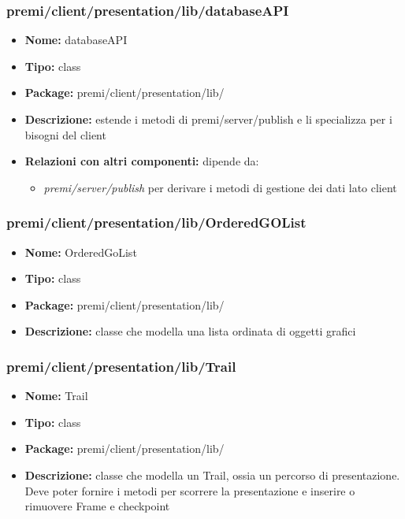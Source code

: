 \subsubsection{premi/client/presentation/lib/databaseAPI}
\begin{itemize}
  \item[] \textbf{Nome:} databaseAPI
  \item[] \textbf{Tipo:} class
  \item[] \textbf{Package:} premi/client/presentation/lib/
  \item[] \textbf{Descrizione:} estende i metodi di premi/server/publish e li specializza per i bisogni del client
   \item[] \textbf{Relazioni con altri componenti:} dipende da:
 \begin{itemize}
 \item \textit{premi/server/publish} per derivare i metodi di gestione dei dati lato client
 \end{itemize}
\end{itemize}


\subsubsection{premi/client/presentation/lib/OrderedGOList}
\begin{itemize}
  \item[] \textbf{Nome:} OrderedGoList
  \item[] \textbf{Tipo:} class
  \item[] \textbf{Package:} premi/client/presentation/lib/
  \item[] \textbf{Descrizione:} classe che modella una lista ordinata di oggetti grafici
\end{itemize}
  
\subsubsection{premi/client/presentation/lib/Trail}
\begin{itemize}
  \item[] \textbf{Nome:} Trail
  \item[] \textbf{Tipo:} class
  \item[] \textbf{Package:} premi/client/presentation/lib/
  \item[] \textbf{Descrizione:} classe che modella un Trail, ossia un percorso di presentazione. Deve poter fornire i metodi per scorrere la presentazione e inserire o rimuovere Frame e checkpoint
\end{itemize}



